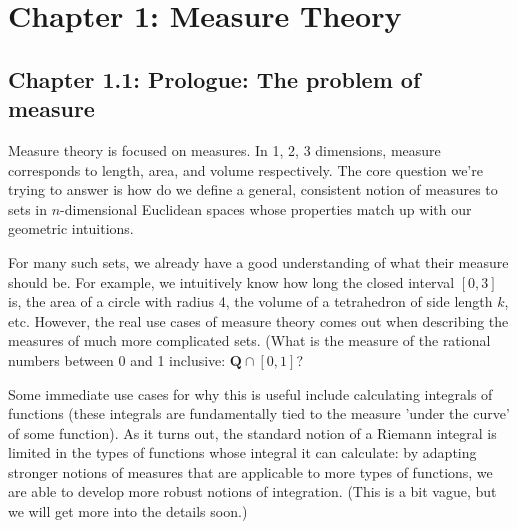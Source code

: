 \documentclass[answers,12pt]{exam}
\begin{document}
\section{Chapter 1: Measure Theory}

\subsection{Chapter 1.1: Prologue: The problem of measure}
Measure theory is focused on measures. 
In 1, 2, 3 dimensions, measure corresponds to length, area, and volume respectively.
The core question we're trying to answer is how do we define a general, consistent notion of measures to sets in $n$-dimensional Euclidean spaces whose properties match up with our geometric intuitions.

For many such sets, we already have a good understanding of what their measure should be.
For example, we intuitively know how long the closed interval $[0,3]$ is, the area of a circle with radius 4, the volume of a tetrahedron of side length $k$, etc.
However, the real use cases of measure theory comes out when describing the measures of much more complicated sets. (What is the measure of the rational numbers between 0 and 1 inclusive: $\mathbf{Q} \cap [0,1]$? 

Some immediate use cases for why this is useful include calculating integrals of functions (these integrals are fundamentally tied to the measure 
'under the curve' of some function).
As it turns out, the standard notion of a Riemann integral is limited in the types of functions whose integral it can calculate: by adapting stronger notions of measures that are applicable to more types of functions, we are able to develop more robust notions of integration.
(This is a bit vague, but we will get more into the details soon.)
\end{document}
